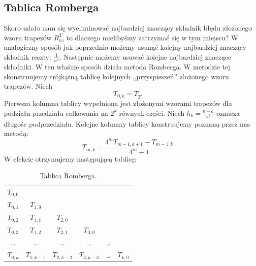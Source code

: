 \documentclass{article}
\begin{document}
\subsection{Tablica Romberga}
Skoro udało nam się wyeliminować najbardziej znaczący składnik błędu złożonego wzoru
trapezów $R_n^T$, to dlaczego mielibyśmy zatrzymać się w tym miejscu? W analogiczny sposób jak poprzednio możemy usunąć
kolejny najbardziej znaczący składnik reszty: $\frac{1}{n^4}$. Następnie możemy usuwać kolejne najbardziej znaczące
składniki. W ten właśnie sposób działa metoda Romberga.
\newline
\newline
W metodzie tej skonstruujemy trójkątną tablicę kolejnych ,,przyspieszeń'' złożonego wzoru trapezów.
Niech
\begin{equation*}
T_{0,k} = T_{2^k}
\end{equation*}
Pierwsza kolumna tablicy wypełniona jest złożonymi wzorami trapezów dla podziału
przedziału całkowania na $2^k$ równych części. Niech $h_k = \frac{b - a}{2^k}$ oznacza długośc podprzedziału.
\newline
\newline
Kolejne kolumny tablicy konstruujemy poznaną przez nas metodą:
\begin{equation}
	T_{m,k} = \frac{4^m T_{m - 1, k + 1} - T_{m - 1, k}}{4^m - 1}
\end{equation}
W efekcie otrzymujemy następującą tablicę:

\begin{table}[h]
\centering
\begin{tabular}[c]{|c c c c c c|}
\hline
$T_{0,0}$ &  &  &  &  & \\
$T_{0,1}$ & $T_{1,0}$ &  &  & & \\
$T_{0,2}$ & $T_{1,1}$ & $T_{2,0}$ & & & \\
$T_{0,3}$ & $T_{1,2}$ & $T_{2,1}$ & $T_{3,0}$ &  &  \\
\dots & \dots & \dots & \dots & \dots & \\
$T_{0,k}$ & $T_{1,k - 1}$ & $T_{2,k - 2}$ & $T_{3,k - 3}$ & \dots & $T_{k,0}$ \\
\hline
\end{tabular}
\caption{Tablica Romberga.}
\end{table}
\end{document}
